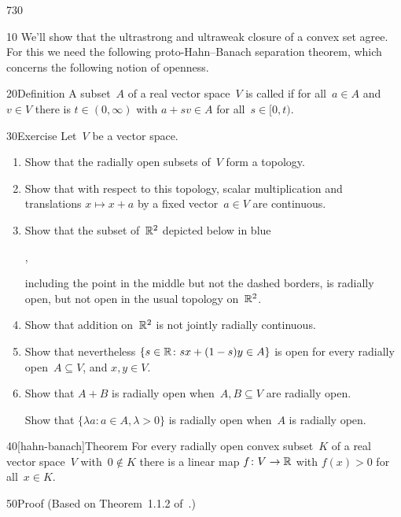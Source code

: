 \begin{parsec}{730}%
\begin{point}{10}%
We'll show that the ultrastrong and ultraweak closure
of a convex set agree. 
For this we need the following proto-Hahn--Banach separation theorem,
which concerns the following notion of openness.
\end{point}
\begin{point}{20}{Definition}%
A subset~$A$ of a real vector space~$V$ 
is called %
if for all~$a\in A$ and~$v\in V$
there is $t\in (0,\infty)$
with $a+sv\in A$ for all~$s\in [0,t)$.
\end{point}
\begin{point}{30}{Exercise}%
Let~$V$ be a vector space.
\begin{enumerate}
\item
Show that the radially open subsets of~$V$ form a topology.
\item
Show that with respect to this topology,
scalar multiplication and translations $x\mapsto x+a$
by a fixed vector~$a\in V$ are continuous.
\item
Show that 
the subset of~$\mathbb{R}^2$ depicted below in blue
\begin{center}
,
\end{center}
including the point in the middle
but not the dashed borders,
is radially open, but not open in the usual topology on~$\mathbb{R}^2$.
\item
Show that addition on~$\mathbb{R}^2$ is not jointly radially continuous.
\item
	Show that nevertheless $\{s\in \mathbb{R} \colon sx+(1-s) y\in A\}$
is open for every radially open~$A\subseteq V$, and $x,y\in V$.
\item
Show that $A+B$ is radially open when~$A,B\subseteq V$ are radially open.

Show that $\{\lambda a\colon a\in A,\lambda>0\}$ is radially open
when~$A$ is radially open.
\end{enumerate}
\end{point}
\begin{point}{40}[hahn-banach]{Theorem}%
For every radially open
convex subset~$K$ of a real vector space~$V$
with~$0\notin K$
there is a linear map $f\colon V\to\mathbb{R}$
with $f(x)>0$ for all~$x\in K$.
\begin{point}{50}{Proof}%
(Based on Theorem~1.1.2 of~\cite{kr}.)


\end{point}
\end{point}
\end{parsec}
